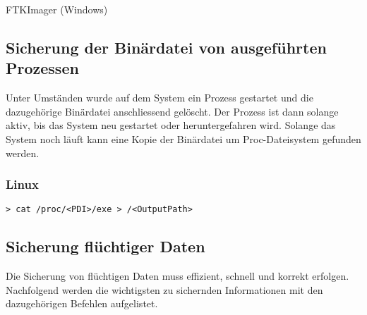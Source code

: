 FTKImager (Windows)



\subsection{Sicherung der Binärdatei von ausgeführten Prozessen}
Unter Umständen wurde auf dem System ein Prozess gestartet und die dazugehörige Binärdatei anschliessend gelöscht. Der Prozess ist dann solange aktiv, bis das System neu gestartet oder heruntergefahren wird. Solange das System noch läuft kann eine Kopie der Binärdatei um Proc-Dateisystem gefunden werden.

\subsubsection{Linux}
\begin{lstlisting}
> cat /proc/<PDI>/exe > /<OutputPath>
\end{lstlisting}



\subsection{Sicherung flüchtiger Daten}
Die Sicherung von flüchtigen Daten muss effizient, schnell und korrekt erfolgen. Nachfolgend werden die wichtigsten zu sichernden Informationen mit den dazugehörigen Befehlen aufgelistet.

